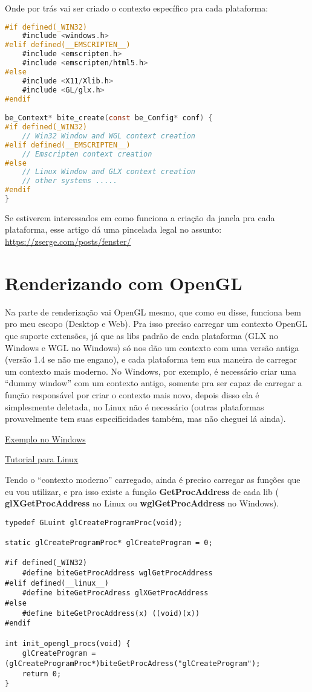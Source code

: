 \documentclass[a4paper,oneside,12pt]{article}
\newcommand{\mybox}[1]{%
    \colorbox{bg}{\textbf{#1}}
}
\begin{document}
Onde por trás vai ser criado o contexto específico pra cada plataforma:

\begin{lstlisting}[language=C]
#if defined(_WIN32)
	#include <windows.h>
#elif defined(__EMSCRIPTEN__)
	#include <emscripten.h>
	#include <emscripten/html5.h>
#else
	#include <X11/Xlib.h>
	#include <GL/glx.h>
#endif

be_Context* bite_create(const be_Config* conf) {
#if defined(_WIN32)
	// Win32 Window and WGL context creation
#elif defined(__EMSCRIPTEN__)
	// Emscripten context creation
#else
	// Linux Window and GLX context creation
	// other systems .....
#endif
}
\end{lstlisting}

Se estiverem interessados em como funciona a criação da janela pra cada plataforma, esse artigo dá uma pincelada legal no assunto: \url{https://zserge.com/posts/fenster/}

\section{Renderizando com OpenGL}

Na parte de renderização vai OpenGL mesmo, que como eu disse, funciona bem pro meu escopo (Desktop e Web). Pra isso preciso carregar um contexto OpenGL que suporte extensões, já que as libs padrão de cada plataforma (GLX no Windows e WGL no Windows) só nos dão um contexto com uma versão antiga (versão 1.4 se não me engano), e cada plataforma tem sua maneira de carregar um contexto mais moderno. No Windows, por exemplo, é necessário criar uma ``dummy window'' com um contexto antigo, somente pra ser capaz de carregar a função responsável por criar o contexto mais novo, depois disso ela é simplesmente deletada, no Linux não é necessário (outras plataformas provavelmente tem suas especificidades também, mas não cheguei lá ainda).

\href{https://gist.github.com/nickrolfe/1127313ed1dbf80254b614a721b3ee9c}{Exemplo no Windows}

\href{https://apoorvaj.io/creating-a-modern-opengl-context/}{Tutorial para Linux}

Tendo o “contexto moderno” carregado, ainda é preciso carregar as funções que eu vou utilizar, e pra isso existe a função \mybox{GetProcAddress} de cada lib (\mybox{glXGetProcAddress} no Linux ou \mybox{wglGetProcAddress} no Windows).

\begin{lstlisting}
typedef GLuint glCreateProgramProc(void);

static glCreateProgramProc* glCreateProgram = 0;

#if defined(_WIN32)
    #define biteGetProcAddress wglGetProcAddress
#elif defined(__linux__)
    #define biteGetProcAdress glXGetProcAddress
#else
    #define biteGetProcAddress(x) ((void)(x))
#endif

int init_opengl_procs(void) {
    glCreateProgram = (glCreateProgramProc*)biteGetProcAdress("glCreateProgram");
    return 0;
}
\end{lstlisting}
\end{document}
